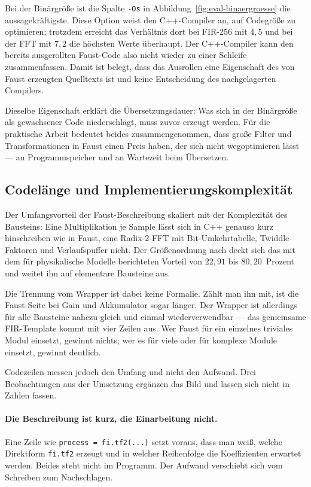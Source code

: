 Bei der Binärgröße ist die Spalte \texttt{-Os} in Abbildung~\ref{fig:eval-binaergroesse} die aussagekräftigste. Diese Option weist den C++-Compiler an, auf Codegröße zu optimieren; trotzdem erreicht das Verhältnis dort bei FIR-256 mit $4{,}5$ und bei der FFT mit $7{,}2$ die höchsten Werte überhaupt. Der C++-Compiler kann den bereits ausgerollten Faust-Code also nicht wieder zu einer Schleife zusammenfassen. Damit ist belegt, dass das Ausrollen eine Eigenschaft des von Faust erzeugten Quelltexts ist und keine Entscheidung des nachgelagerten Compilers.

Dieselbe Eigenschaft erklärt die Übersetzungsdauer: Was sich in der Binärgröße als gewachsener Code niederschlägt, muss zuvor erzeugt werden. Für die praktische Arbeit bedeutet beides zusammengenommen, dass große Filter und Transformationen in Faust einen Preis haben, der sich nicht wegoptimieren lässt --- an Programmspeicher und an Wartezeit beim Übersetzen.

\subsection{Codelänge und Implementierungskomplexität}
\label{subsec:disk-code}

Der Umfangsvorteil der Faust-Beschreibung skaliert mit der Komplexität des Bausteins: Eine Multiplikation je Sample lässt sich in C++ genauso kurz hinschreiben wie in Faust, eine Radix-2-FFT mit Bit-Umkehrtabelle, Twiddle-Faktoren und Verlaufspuffer nicht. Der Größenordnung nach deckt sich das mit dem für physikalische Modelle berichteten Vorteil von $22{,}91$ bis $80{,}20$~Prozent \parencite{michon2011fauststk} und weitet ihn auf elementare Bausteine aus.

Die Trennung vom Wrapper ist dabei keine Formalie. Zählt man ihn mit, ist die Faust-Seite bei Gain und Akkumulator sogar länger. Der Wrapper ist allerdings für alle Bausteine nahezu gleich und einmal wiederverwendbar --- das gemeinsame FIR-Template kommt mit vier Zeilen aus. Wer Faust für ein einzelnes triviales Modul einsetzt, gewinnt nichts; wer es für viele oder für komplexe Module einsetzt, gewinnt deutlich.

Codezeilen messen jedoch den Umfang und nicht den Aufwand. Drei Beobachtungen aus der Umsetzung ergänzen das Bild und lassen sich nicht in Zahlen fassen.

\paragraph{Die Beschreibung ist kurz, die Einarbeitung nicht.}
Eine Zeile wie \texttt{process = fi.tf2(...)} setzt voraus, dass man weiß, welche Direktform \texttt{fi.tf2} erzeugt und in welcher Reihenfolge die Koeffizienten erwartet werden. Beides steht nicht im Programm. Der Aufwand verschiebt sich vom Schreiben zum Nachschlagen.


